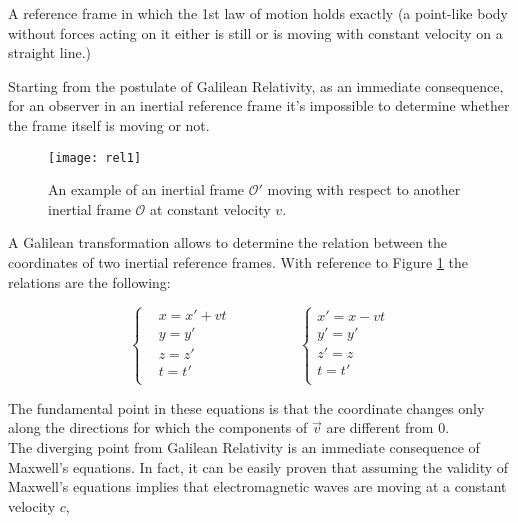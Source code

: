 \begin{definition}
  A reference frame in which the 1st law of motion holds exactly (a point-like body without forces acting on it either is still or is moving with constant velocity on a straight line.)
\end{definition}

Starting from the postulate of Galilean Relativity, as an immediate consequence, for an observer in an inertial reference frame it's impossible to determine whether the frame itself is moving or not. \\

\begin{figure}
  \centering
  \texttt{[image: rel1]}
  \caption{An example of an inertial frame $\mathcal{O}'$ moving with respect to another inertial frame $\mathcal{O}$ at constant velocity $v$.}
  \label{fig:rel1}
\end{figure}
A Galilean transformation allows to determine the relation between the coordinates of two inertial reference frames. With reference to Figure \ref{fig:rel1} the relations are the following:

\begin{equation}
  \begin{cases}
    &x = x' + vt\\
    &y = y'\\
    &z = z'\\
    &t = t'\\  
  \end{cases}
  \hspace{2cm}
  \begin{cases}
    x' = x - vt\\
    y' = y'\\
    z' = z\\
    t = t'\\  
  \end{cases}
\end{equation}

The fundamental point in these equations is that the coordinate changes only along the directions for which the components of $\vec{v}$ are different from $0$.\\

The diverging point from Galilean Relativity is an immediate consequence of Maxwell's equations. In fact, it can be easily proven that assuming the validity of Maxwell's equations implies that electromagnetic waves are moving at a constant velocity $c$, \\

